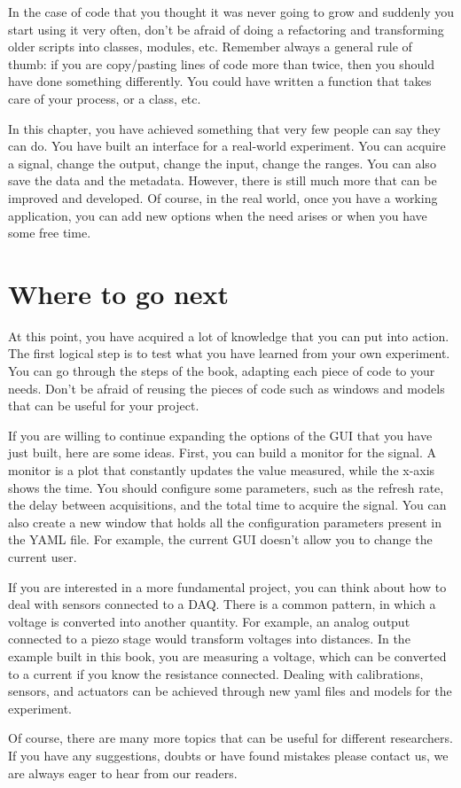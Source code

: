 In the case of code that you thought it was never going to grow and
suddenly you start using it very often, don't be afraid of doing a
refactoring and transforming older scripts into classes, modules, etc.
Remember always a general rule of thumb: if you are copy/pasting lines
of code more than twice, then you should have done something
differently. You could have written a function that takes care of your
process, or a class, etc.

In this chapter, you have achieved something that very few people can
say they can do. You have built an interface for a real-world
experiment. You can acquire a signal, change the output, change the
input, change the ranges. You can also save the data and the metadata.
However, there is still much more that can be improved and developed. Of
course, in the real world, once you have a working application, you can
add new options when the need arises or when you have some free time.

\section{Where to go next}\label{where-to-gonext}
At this point, you have acquired a lot of knowledge that you can put
into action. The first logical step is to test what you have learned
from your own experiment. You can go through the steps of the book,
adapting each piece of code to your needs. Don't be afraid of reusing
the pieces of code such as windows and models that can be useful for
your project.

If you are willing to continue expanding the options of the {GUI} that
you have just built, here are some ideas. First, you can build a monitor
for the signal. A monitor is a plot that constantly updates the value
measured, while the x-axis shows the time. You should configure some
parameters, such as the refresh rate, the delay between acquisitions,
and the total time to acquire the signal. You can also create a new
window that holds all the configuration parameters present in the {YAML}
file. For example, the current {GUI} doesn't allow you to change the
current user.

If you are interested in a more fundamental project, you can think about
how to deal with sensors connected to a {DAQ}. There is a common
pattern, in which a voltage is converted into another quantity. For
example, an analog output connected to a piezo stage would transform
voltages into distances. In the example built in this book, you are
measuring a voltage, which can be converted to a current if you know the
resistance connected. Dealing with calibrations, sensors, and actuators
can be achieved through new yaml files and models for the experiment.

Of course, there are many more topics that can be useful for different
researchers. If you have any suggestions, doubts or have found mistakes
please contact us, we are always eager to hear from our readers.
